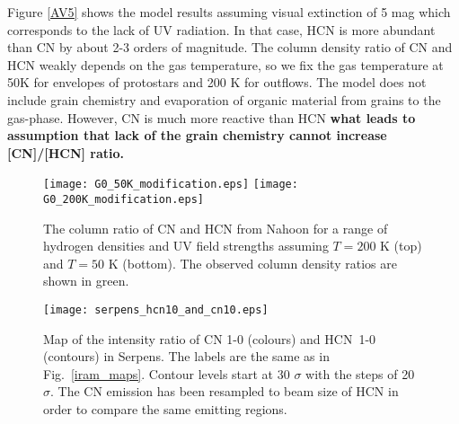 \documentclass{aa}
\begin{document}
Figure \ref{AV5} shows the model results assuming visual extinction of 5 mag which corresponds to the lack 
of UV radiation. In that case, HCN is more abundant than CN by about 2-3
orders of magnitude. The column density ratio of CN and HCN weakly depends on the 
gas temperature, so we fix the gas temperature at 50K for envelopes of protostars and 200 K for outflows. The model does not include grain chemistry and evaporation of organic material from grains to the gas-phase. However, CN is much more reactive than HCN \textbf{what leads to assumption that lack of the grain chemistry cannot increase [CN]/[HCN] ratio.}
\begin{figure} 
\centering \texttt{[image: G0\_50K\_modification.eps]} 
\texttt{[image: G0\_200K\_modification.eps]} 
\caption{The column ratio of CN and HCN from Nahoon for a 
range of hydrogen densities and UV field strengths assuming $T = 200$ K (top) 
and $T = 50$ K (bottom). The observed column density ratios are shown in green.} 
\label{G0_50} 
\end{figure}
\begin{figure} 
\centering 
\texttt{[image: serpens\_hcn10\_and\_cn10.eps]}
\caption{Map of the intensity ratio of CN 1-0 (colours) and \mbox{HCN 1-0}
(contours) in Serpens. The labels are the same as in Fig.~\ref{iram_maps}. Contour levels start at 30 $\sigma$ with the steps of 20 $\sigma$.
The CN emission has been resampled to beam size of HCN in order to compare the same emitting regions.} 
\label{cn10_and_hcn10} 
\end{figure}
\end{document}
